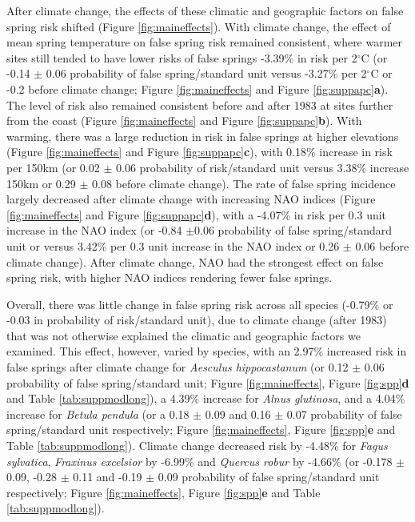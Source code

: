 \documentclass{article}\usepackage[]{graphicx}\usepackage[]{color}
\begin{document}
After climate change, the effects of these climatic and geographic factors on false spring risk shifted (Figure \ref{fig:maineffects}). With climate change, the effect of mean spring temperature on false spring risk remained consistent, where warmer sites still tended to have lower risks of false springs -3.39\% in risk per 2$^{\circ}$C (or -0.14 $\pm$ 0.06 probability of false spring/standard unit versus -3.27\% per 2$^{\circ}$C or -0.2 before climate change; Figure \ref{fig:maineffects} and Figure \ref{fig:suppapc}\textbf{a}). The level of risk also remained consistent before and after 1983 at sites further from the coast (Figure \ref{fig:maineffects} and Figure \ref{fig:suppapc}\textbf{b}). With warming, there was a large reduction in risk in false springs at higher elevations (Figure \ref{fig:maineffects} and Figure \ref{fig:suppapc}\textbf{c}), with 0.18\% increase in risk per 150km (or 0.02 $\pm$ 0.06 probability of risk/standard unit versus 3.38\% increase 150km or 0.29 $\pm$ 0.08 before climate change). The rate of false spring incidence largely decreased after climate change with increasing NAO indices (Figure \ref{fig:maineffects} and Figure \ref{fig:suppapc}\textbf{d}), with a -4.07\% in risk per 0.3 unit increase in the NAO index (or -0.84 $\pm$0.06 probability of false spring/standard unit or versus 3.42\% per 0.3 unit increase in the NAO index or 0.26 $\pm$ 0.06 before climate change). After climate change, NAO had the strongest effect on false spring risk, with higher NAO indices rendering fewer false springs.

Overall, there was little change in false spring risk across all species (-0.79\% or -0.03 in probability of risk/standard unit), due to climate change (after 1983) that was not otherwise explained the climatic and geographic factors we examined. This effect, however, varied by species, with an 2.97\% increased risk in false springs after climate change for \textit{Aesculus hippocastanum} (or 0.12 $\pm$ 0.06 probability of false spring/standard unit; Figure \ref{fig:maineffects}, Figure \ref{fig:spp}\textbf{d} and Table \ref{tab:suppmodlong}), a 4.39\% increase for \textit{Alnus glutinosa}, and a 4.04\% increase for \textit{Betula pendula} (or a 0.18 $\pm$ 0.09 and 0.16 $\pm$ 0.07 probability of false spring/standard unit respectively; Figure \ref{fig:maineffects}, Figure \ref{fig:spp}\textbf{e} and Table \ref{tab:suppmodlong}). Climate change decreased risk by -4.48\% for \textit{Fagus sylvatica}, \textit{Fraxinus excelsior} by -6.99\% and \textit{Quercus robur} by -4.66\% (or -0.178 $\pm$ 0.09, -0.28 $\pm$ 0.11 and -0.19 $\pm$ 0.09 probability of false spring/standard unit respectively; Figure \ref{fig:maineffects}, Figure \ref{fig:spp}\textbf{e} and Table \ref{tab:suppmodlong}).  
\end{document}
